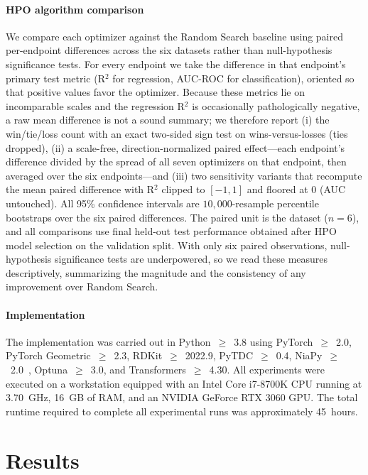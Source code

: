 \documentclass[journal]{IEEEtran}
\begin{document}
\paragraph{HPO algorithm comparison}
We compare each optimizer against the Random Search baseline using paired per-endpoint differences across the six datasets rather than null-hypothesis significance tests. For every endpoint we take the difference in that endpoint's primary test metric (R$^2$ for regression, AUC-ROC for classification), oriented so that positive values favor the optimizer. Because these metrics lie on incomparable scales and the regression R$^2$ is occasionally pathologically negative, a raw mean difference is not a sound summary; we therefore report (i) the win/tie/loss count with an exact two-sided sign test on wins-versus-losses (ties dropped), (ii) a scale-free, direction-normalized paired effect---each endpoint's difference divided by the spread of all seven optimizers on that endpoint, then averaged over the six endpoints---and (iii) two sensitivity variants that recompute the mean paired difference with R$^2$ clipped to $[-1,1]$ and floored at $0$ (AUC untouched). All 95\% confidence intervals are $10{,}000$-resample percentile bootstraps over the six paired differences. The paired unit is the dataset ($n=6$), and all comparisons use final held-out test performance obtained after HPO model selection on the validation split. With only six paired observations, null-hypothesis significance tests are underpowered, so we read these measures descriptively, summarizing the magnitude and the consistency of any improvement over Random Search.

\paragraph{Implementation}
The implementation was carried out in Python~$\geq$~3.8 using PyTorch~$\geq$~2.0, PyTorch Geometric~$\geq$~2.3, RDKit~$\geq$~2022.9, PyTDC~$\geq$~0.4, NiaPy~$\geq$~2.0~\cite{niapy}, Optuna~$\geq$~3.0, and Transformers~$\geq$~4.30.
All experiments were executed on a workstation equipped with an Intel Core i7-8700K CPU running at 3.70~GHz, 16~GB of RAM, and an NVIDIA GeForce RTX 3060 GPU.
The total runtime required to complete all experimental runs was approximately 45~hours.


\section{Results}
\label{sec:results}
\end{document}
